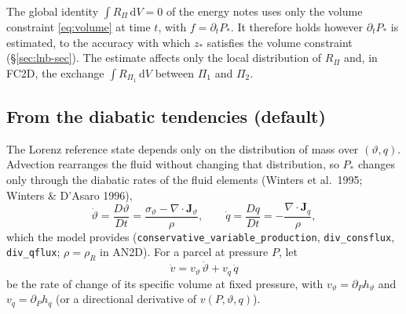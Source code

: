 \documentclass[11pt,a4paper]{article}
\newcommand{\vt}{\vartheta}
\newcommand{\code}[1]{\texttt{#1}}
\newcommand{\zs}{z_{*}}
\begin{document}
The global identity $\int R_\Pi\,\mathrm{d}V=0$ of the energy notes uses only the volume constraint \eqref{eq:volume} at time
$t$, with $f=\partial_tP_*$. It therefore holds however $\partial_tP_*$ is estimated, to the accuracy with which $\zs$ satisfies
the volume constraint (\S\ref{sec:lnb-sec}). The estimate affects only the local distribution of $R_\Pi$ and, in FC2D, the
exchange $\int R_{\Pi_1}\,\mathrm{d}V$ between $\Pi_1$ and $\Pi_2$.

\subsection{From the diabatic tendencies (default)}\label{sec:dtpstar-b}
The Lorenz reference state depends only on the distribution of mass over $(\vt,q)$. Advection rearranges the fluid without
changing that distribution, so $P_*$ changes only through the diabatic rates of the fluid elements (Winters et al.\ 1995;
Winters \& D'Asaro 1996),
\begin{equation}
  \dot\vt=\frac{D\vt}{Dt}=\frac{\sigma_\vt-\nabla\cdot\mathbf J_\vt}{\rho},\qquad
  \dot q=\frac{Dq}{Dt}=-\frac{\nabla\cdot\mathbf J_q}{\rho},
\end{equation}
which the model provides (\code{conservative\_variable\_production}, \code{div\_consflux}, \code{div\_qflux}; $\rho=\rho_R$ in
AN2D). For a parcel at pressure $P$, let
\begin{equation}
  \dot v=v_\vt\,\dot\vt+v_q\,\dot q
\end{equation}
be the rate of change of its specific volume at fixed pressure, with $v_\vt=\partial_Ph_\vt$ and $v_q=\partial_Ph_q$ (or a
directional derivative of $v(P,\vt,q)$).
\end{document}
